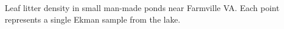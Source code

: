 \label{fig:CPOM_density} 
Leaf litter density in small man-made ponds near Farmville VA. Each point represents a single Ekman sample from the lake.